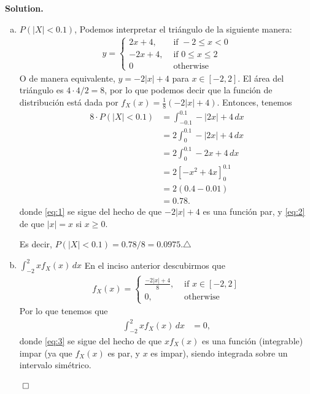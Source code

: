 \documentclass{article}
\theoremstyle{problemstyle}
\newenvironment{solution}{%
  \begin{mdframed}[linewidth=0.8pt,linecolor=Gray,backgroundcolor=Gray!5,roundcorner=5pt]%
  \noindent\textbf{Solution.}%
}{%
\hfill $ \qed $ 
  \end{mdframed}%
}
\begin{document}
\begin{solution}
	\begin{enumerate}[a)]
		\item $ P(|X| < 0.1) $,
		      Podemos interpretar el tri\'angulo de la siguiente manera:
		      \begin{align*} y =
			      \begin{cases}
				      2x+4,  & \text{ if } -2\leq x < 0    \\
				      -2x+4, & \text{ if } 0 \leq x \leq 2 \\
				      0      & \text{ otherwise}
			      \end{cases}
		      \end{align*}
		      O de manera equivalente, $ y = -2|x|+4 $ para $ x\in [-2,2] $.
		      El \'area del tri\'angulo es $ 4\cdot4/2 =8$, por lo que podemos decir que la funci\'on de distribuci\'on est\'a dada por $ f_X(x) = \frac{1}{8}(-2|x|+4) $. Entonces, tenemos
		      \begin{align}
			      8\cdot P(|X|<0.1) & = \displaystyle\int_{-0.1}^{0.1}-|2x|+4\,dx\nonumber    \\
			                        & =2\int_{0}^{0.1} -|2x|+4\,dx\label{eq:1}                \\
			                        & =2\int_{0}^{0.1} -2x+4\,dx                 \label{eq:2} \\
			                        & =2\left[-x^2+4x\right]_{0}^{0.1}            \nonumber   \\
			                        & =2(0.4-0.01)                               \nonumber    \\
			                        & =0.78.\nonumber
		      \end{align}
		      donde \eqref{eq:1} se sigue del hecho de que $ -2|x|+4 $ es una funci\'on par, y \eqref{eq:2} de que $ |x| = x $ si $ x\geq 0 $.

		      Es decir, $ P(|X|<0.1) = 0.78/8 = 0.0975 $.\hfill$\triangle$
		\item $ \displaystyle\int_{-2}^{2}x f_X(x)\,dx $
		      En el inciso anterior descubirmos que
		      \begin{align*}
			      f_X(x) =
			      \begin{cases}
				      \frac{-2|x|+4}{8}, & \text{ if }x\in [-2,2] \\
				      0,                 & \text{ otherwise}
			      \end{cases}
		      \end{align*}
		      Por lo que tenemos que
		      \begin{align}
			      \int_{-2}^{2}x f_X(x)\,dx & = 0,\label{eq:3}
		      \end{align}
		      donde \eqref{eq:3} se sigue del hecho de que $ xf_X(x) $ es una funci\'on (integrable) impar (ya que $ f_X(x) $ es par, y $ x $ es impar), siendo integrada sobre un intervalo sim\'etrico.
	\end{enumerate}
\end{solution}
\end{document}
